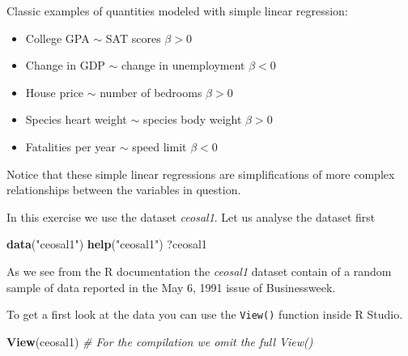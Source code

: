 \documentclass[]{book}
\newenvironment{Shaded}{\begin{snugshade}}{\end{snugshade}}
\newcommand{\CommentTok}[1]{\textcolor[rgb]{0.56,0.35,0.01}{\textit{#1}}}
\newcommand{\KeywordTok}[1]{\textcolor[rgb]{0.13,0.29,0.53}{\textbf{#1}}}
\newcommand{\NormalTok}[1]{#1}
\newcommand{\StringTok}[1]{\textcolor[rgb]{0.31,0.60,0.02}{#1}}
\providecommand{\tightlist}{%
  \setlength{\itemsep}{0pt}\setlength{\parskip}{0pt}}
\begin{document}
Classic examples of quantities modeled with simple linear regression:

\begin{itemize}
\tightlist
\item
  College GPA \(\sim\) SAT scores \(\beta > 0\)
\item
  Change in GDP \(\sim\) change in unemployment \(\beta < 0\)
\item
  House price \(\sim\) number of bedrooms \(\beta > 0\)
\item
  Species heart weight \(\sim\) species body weight \(\beta > 0\)
\item
  Fatalities per year \(\sim\) speed limit \(\beta < 0\)
\end{itemize}

Notice that these simple linear regressions are simplifications of more
complex relationships between the variables in question.

In this exercise we use the dataset \emph{ceosal1}. Let us analyse the
dataset first

\begin{Shaded}
\begin{Highlighting}[]
\KeywordTok{data}\NormalTok{(}\StringTok{"ceosal1"}\NormalTok{)}
\KeywordTok{help}\NormalTok{(}\StringTok{"ceosal1"}\NormalTok{)}
\NormalTok{?ceosal1}
\end{Highlighting}
\end{Shaded}

As we see from the R documentation the \emph{ceosal1} dataset contain of
a random sample of data reported in the May 6, 1991 issue of
Businessweek.

To get a first look at the data you can use the \texttt{View()} function
inside R Studio.

\begin{Shaded}
\begin{Highlighting}[]
\KeywordTok{View}\NormalTok{(ceosal1) }\CommentTok{# For the compilation we omit the full View()}
\end{Highlighting}
\end{Shaded}
\end{document}
